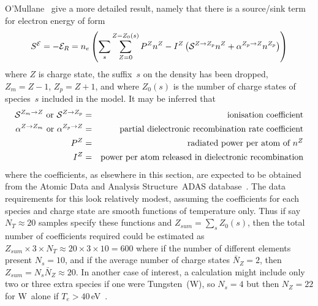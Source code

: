 O'Mullane~\cite{omullane} give a more
detailed result, namely that
there is a source/sink term for electron energy of form 
\begin{equation} \label{eq:eesource}
S^\mathcal{E}=-\mathcal{E}_R=n_e \left( \sum_s \sum_{Z=0}^{Z=Z_0(s)} P^Z n^Z -
I^Z \left(\mathcal{S}^{Z\rightarrow Z_p}n^Z+\alpha^{Z_p\rightarrow Z}n^{Z_p}\right) \right)
\end{equation}
where $Z$ is charge state,
the suffix~$s$ on the density has been dropped, $Z_m=Z-1$, $Z_p=Z+1$, and
where $Z_0(s)$ is the number of charge states of species~$s$ included in the model.
It may be inferred that
\begin{eqnarray}
\mathcal{S}^{Z_m\rightarrow Z} \mbox{ or }
\mathcal{S}^{Z\rightarrow Z_p} &=&\mbox{ionisation coefficient}\\
\alpha^{Z\rightarrow Z_m} \mbox{ or }
\alpha^{Z_p\rightarrow Z} &=&\mbox{partial dielectronic recombination rate coefficient}\\
P^Z &=&\mbox{radiated power per atom of $n^Z$}\\
I^Z &=&\mbox{power per atom released in dielectronic recombination}
\end{eqnarray}
where the coefficients, as elsewhere in this section, are expected to be obtained from the
Atomic Data and Analysis Structure~ADAS database~\cite {adaswebsite,openadaswebsite}.
The data requirements for this look relatively modest, assuming the coefficients for
each species and charge state are smooth functions of temperature only. Thus if say
$N_T\approx 20$ samples specify these functions 
and $Z_{sum}=\sum_s Z_0(s)$, then the total number of coefficients required
could be estimated as~$Z_{sum} \times 3 \times N_T \approx 20 \times 3 \times 10 =600$ where
if the number of different elements present $N_s=10$, and
if the average number of charge states $\bar{N}_Z=2$, then $Z_{sum} =N_s \bar{N}_Z \approx 20$.
In another case of interest, a calculation might include only two or three extra species if one were Tungsten~(W),
so $N_s=4$ but then $N_Z=22$ for W~alone if $T_e>40$\,eV~\cite{williamswebsite}.


